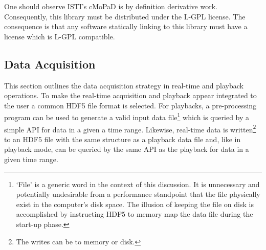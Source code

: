 \documentclass[12pt]{article}
\begin{document}
One should observe ISTI's cMoPaD is by definition derivative work.  Consequently, this library
must be distributed under the L-GPL license.  The consequence is that any software statically
linking to this library must have a license which is L-GPL compatible.

\clearpage
\subsection{Data Acquisition}
This section outlines the data acquisition strategy in real-time and playback operations.
To make the real-time acquisition and playback appear integrated to the user a common
HDF5 file format is selected.  For playbacks, a pre-processing program can be used to generate 
a valid input data 
file\footnote{`File' is a generic word in the context of this discussion.  
It is unnecessary and potentially undesirable from a performance standpoint that
the file physically exist in the computer's disk space.  The illusion of keeping 
the file on disk is accomplished by instructing HDF5 to memory map the data 
file during the start-up phase.}
which is queried by a simple API for data in a given a time range.  
Likewise, real-time data is  
written\footnote{The writes can be to memory or disk.}
to an HDF5 file with the same structure as a playback data file and, like in playback mode,
can be queried by the same API as the playback for data in a given time range.
\end{document}

